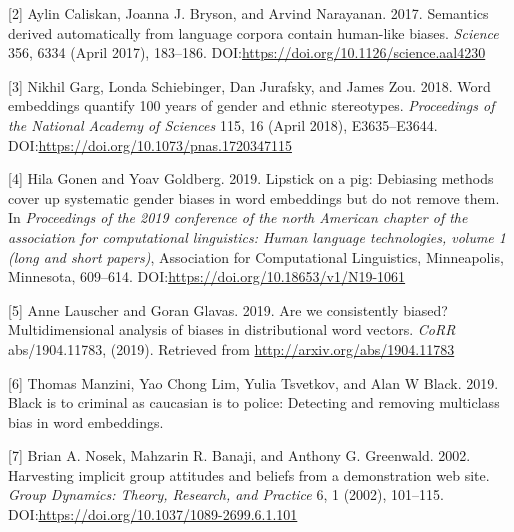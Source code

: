 \documentclass[12pt,dvipsnames,enabledeprecatedfontcommands]{scrartcl}
\begin{document}
\hypertarget{ref-Caliskan2017semanticsBiases}{}
{[}2{]} Aylin Caliskan, Joanna J. Bryson, and Arvind Narayanan. 2017.
Semantics derived automatically from language corpora contain human-like
biases. \emph{Science} 356, 6334 (April 2017), 183--186.
DOI:\url{https://doi.org/10.1126/science.aal4230}

\hypertarget{ref-Garg2018years}{}
{[}3{]} Nikhil Garg, Londa Schiebinger, Dan Jurafsky, and James Zou.
2018. Word embeddings quantify 100 years of gender and ethnic
stereotypes. \emph{Proceedings of the National Academy of Sciences} 115,
16 (April 2018), E3635--E3644.
DOI:\url{https://doi.org/10.1073/pnas.1720347115}

\hypertarget{ref-Gonen2019lipstick}{}
{[}4{]} Hila Gonen and Yoav Goldberg. 2019. Lipstick on a pig: Debiasing
methods cover up systematic gender biases in word embeddings but do not
remove them. In \emph{Proceedings of the 2019 conference of the north
American chapter of the association for computational linguistics: Human
language technologies, volume 1 (long and short papers)}, Association
for Computational Linguistics, Minneapolis, Minnesota, 609--614.
DOI:\url{https://doi.org/10.18653/v1/N19-1061}

\hypertarget{ref-Lauscher2019multidimensional}{}
{[}5{]} Anne Lauscher and Goran Glavas. 2019. Are we consistently
biased? Multidimensional analysis of biases in distributional word
vectors. \emph{CoRR} abs/1904.11783, (2019). Retrieved from
\url{http://arxiv.org/abs/1904.11783}

\hypertarget{ref-Manzini2019blackToCriminal}{}
{[}6{]} Thomas Manzini, Yao Chong Lim, Yulia Tsvetkov, and Alan W Black.
2019. Black is to criminal as caucasian is to police: Detecting and
removing multiclass bias in word embeddings.

\hypertarget{ref-Nosek2002harvesting}{}
{[}7{]} Brian A. Nosek, Mahzarin R. Banaji, and Anthony G. Greenwald.
2002. Harvesting implicit group attitudes and beliefs from a
demonstration web site. \emph{Group Dynamics: Theory, Research, and
Practice} 6, 1 (2002), 101--115.
DOI:\url{https://doi.org/10.1037/1089-2699.6.1.101}
\end{document}
